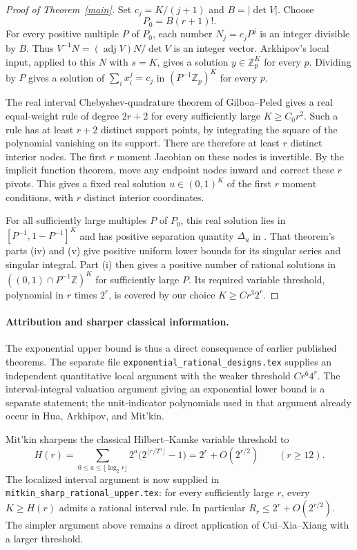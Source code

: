 \documentclass[11pt]{article}
\begin{document}
\begin{proof}[Proof of Theorem~\ref{main}]
Set $c_j=K/(j+1)$ and $B=|\det V|$. Choose
\[
 P_0=B(r+1)!.
\]
For every positive multiple $P$ of $P_0$, each number
$N_j=c_jP^j$ is an integer divisible by $B$. Thus
$V^{-1}N=(\operatorname{adj}V)N/\det V$ is an integer vector.
Arkhipov's local input, applied to this $N$ with $s=K$, gives a solution
$y\in\mathbb Z_p^K$ for every $p$. Dividing by $P$ gives a solution of
$\sum_i x_i^j=c_j$ in $(P^{-1}\mathbb Z_p)^K$ for every $p$.

The real interval Chebyshev-quadrature theorem of Gilboa--Peled gives a
real equal-weight rule of degree $2r+2$ for every sufficiently large
$K\ge C_0r^2$. Such a rule has at least $r+2$ distinct support points,
by integrating the square of the polynomial vanishing on its support.
There are therefore at least $r$ distinct interior nodes. The first $r$
moment Jacobian on these nodes is invertible. By the implicit function
theorem, move any endpoint nodes inward and correct these $r$ pivots.
This gives a fixed real solution $u\in(0,1)^K$ of the first $r$ moment
conditions, with $r$ distinct interior coordinates.

For all sufficiently large multiples $P$ of $P_0$, this real solution
lies in $[P^{-1},1-P^{-1}]^K$ and has positive separation quantity
$\Delta_u$ in \cite[Theorem 5.2(v)]{cxx}. That theorem's parts (iv) and
(v) give positive uniform lower bounds for its singular series and
singular integral. Part (i) then gives a positive number of rational
solutions in $((0,1)\cap P^{-1}\mathbb Z)^K$ for sufficiently large $P$.
Its required variable threshold, polynomial in $r$ times $2^r$, is
covered by our choice $K\ge Cr^3 2^r$.
\end{proof}

\paragraph{Attribution and sharper classical information.}
The exponential upper bound is thus a direct consequence of earlier
published theorems. The separate file
\texttt{exponential\_rational\_designs.tex} supplies an independent
quantitative local argument with the weaker threshold $Cr^6 4^r$.
The interval-integral valuation argument giving an exponential lower
bound is a separate statement; the unit-indicator polynomials used in
that argument already occur in Hua, Arkhipov, and Mit'kin.

Mit'kin \cite{mitkin} sharpens the classical Hilbert--Kamke variable
threshold to
\[
 H(r)=\sum_{0\le a\le\lfloor\log_2r\rfloor}
        2^a\bigl(2^{\lfloor r/2^a\rfloor}-1\bigr)
     =2^r+O(2^{r/2})\qquad(r\ge12).
\]
The localized interval argument is now supplied in
\texttt{mitkin\_sharp\_rational\_upper.tex}: for every sufficiently
large $r$, every $K\ge H(r)$ admits a rational interval rule. In
particular $R_r\le2^r+O(2^{r/2})$. The simpler argument above remains
a direct application of Cui--Xia--Xiang with a larger threshold.
\end{document}
